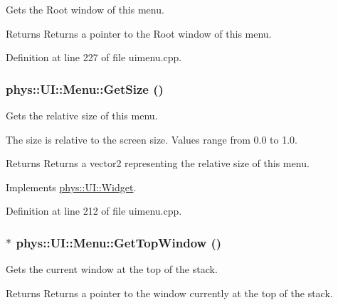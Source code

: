 Gets the Root window of this menu. 

\begin{DoxyReturn}{Returns}
Returns a pointer to the Root window of this menu. 
\end{DoxyReturn}


Definition at line 227 of file uimenu.cpp.

\hypertarget{classphys_1_1UI_1_1Menu_a81781199a62bbe7c2e7693ef301223b4}{
\subsubsection[{GetSize}]{ phys::UI::Menu::GetSize ()}}
\label{d6/dd3/classphys_1_1UI_1_1Menu_a81781199a62bbe7c2e7693ef301223b4}


Gets the relative size of this menu. 

The size is relative to the screen size. Values range from 0.0 to 1.0. \begin{DoxyReturn}{Returns}
Returns a vector2 representing the relative size of this menu. 
\end{DoxyReturn}


Implements \hyperlink{classphys_1_1UI_1_1Widget_a07039c19e57de314147ce066417da0a2}{phys::UI::Widget}.



Definition at line 212 of file uimenu.cpp.

\hypertarget{classphys_1_1UI_1_1Menu_acf9a3bc3dd097093cce077cc60c14a6f}{
\subsubsection[{GetTopWindow}]{ $\ast$ phys::UI::Menu::GetTopWindow ()}}
\label{d6/dd3/classphys_1_1UI_1_1Menu_acf9a3bc3dd097093cce077cc60c14a6f}


Gets the current window at the top of the stack. 

\begin{DoxyReturn}{Returns}
Returns a pointer to the window currently at the top of the stack. 
\end{DoxyReturn}


